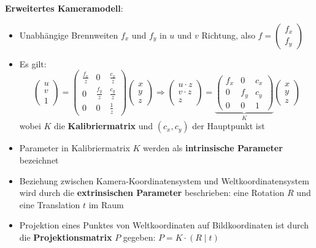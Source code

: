 \bigskip
\textbf{Erweitertes Kameramodell}:
\begin{itemize}
	\item Unabhängige Brennweiten $f_x$ und $f_y$ in $u$ und $v$ Richtung, also $f=\left(
	\begin{matrix}
		f_x \\
		f_y
	\end{matrix}\right)$
	\pagebreak
	
	\item Es gilt:
	$$
	\left(\begin{array}{l}
		u \\
		v \\
		1
	\end{array}\right)=\left(\begin{array}{ccc}
		\frac{f_{x}}{z} & 0 & \frac{c_{x}}{z} \\
		0 & \frac{f_{y}}{z} & \frac{c_{y}}{z} \\
		0 & 0 & \frac{1}{z}
	\end{array}\right)\left(\begin{array}{l}
		x \\
		y \\
		z
	\end{array}\right) \Rightarrow\left(\begin{array}{c}
		u \cdot z \\
		v \cdot z \\
		z
	\end{array}\right)=\underbrace{\left(\begin{array}{ccc}
			f_{x} & 0 & c_{x} \\
			0 & f_{y} & c_{y} \\
			0 & 0 & 1
		\end{array}\right)}_{K}\left(\begin{array}{l}
		x \\
		y \\
		z
	\end{array}\right)
	$$
	wobei $K$ die \textbf{Kalibriermatrix} und $(c_x,c_y)$ der Hauptpunkt ist
	\item Parameter in Kalibriermatrix $K$ werden als \textbf{intrinsische Parameter} bezeichnet
	\item Beziehung zwischen Kamera-Koordinatensystem und Weltkoordinatensystem wird durch die \textbf{extrinsischen Parameter} beschrieben: eine Rotation $R$ und eine Translation $t$ im Raum
	\item Projektion eines Punktes von Weltkoordinaten auf Bildkoordinaten ist durch die \textbf{Projektionsmatrix} $P$ gegeben: $P=K\cdot(R\mid t)$
\end{itemize}
